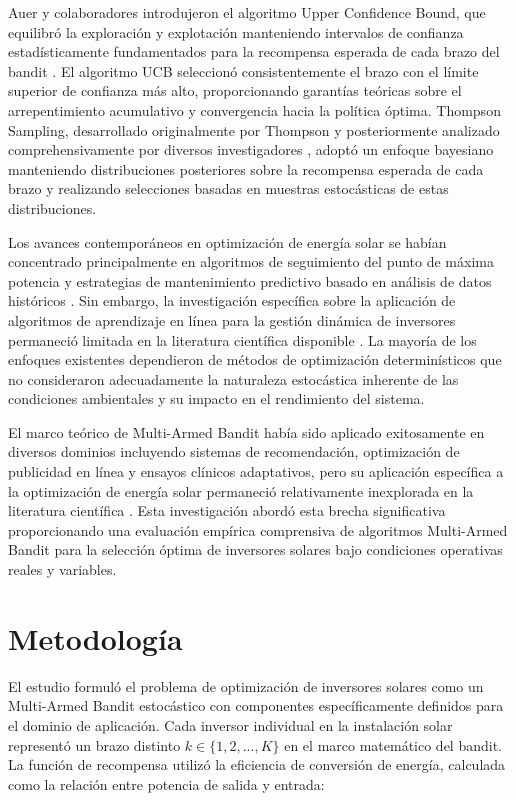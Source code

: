 \documentclass[12pt,a4paper]{article}
\begin{document}
Auer y colaboradores introdujeron el algoritmo Upper Confidence Bound, que equilibró la exploración y explotación manteniendo intervalos de confianza estadísticamente fundamentados para la recompensa esperada de cada brazo del bandit \cite{auer2002}. El algoritmo UCB seleccionó consistentemente el brazo con el límite superior de confianza más alto, proporcionando garantías teóricas sobre el arrepentimiento acumulativo y convergencia hacia la política óptima. Thompson Sampling, desarrollado originalmente por Thompson \cite{thompson1933} y posteriormente analizado comprehensivamente por diversos investigadores \cite{chapelle2011}, adoptó un enfoque bayesiano manteniendo distribuciones posteriores sobre la recompensa esperada de cada brazo y realizando selecciones basadas en muestras estocásticas de estas distribuciones.

Los avances contemporáneos en optimización de energía solar se habían concentrado principalmente en algoritmos de seguimiento del punto de máxima potencia y estrategias de mantenimiento predictivo basado en análisis de datos históricos \cite{motahhir2020}. Sin embargo, la investigación específica sobre la aplicación de algoritmos de aprendizaje en línea para la gestión dinámica de inversores permaneció limitada en la literatura científica disponible \cite{abdel2021}. La mayoría de los enfoques existentes dependieron de métodos de optimización determinísticos que no consideraron adecuadamente la naturaleza estocástica inherente de las condiciones ambientales y su impacto en el rendimiento del sistema.

El marco teórico de Multi-Armed Bandit había sido aplicado exitosamente en diversos dominios incluyendo sistemas de recomendación, optimización de publicidad en línea y ensayos clínicos adaptativos, pero su aplicación específica a la optimización de energía solar permaneció relativamente inexplorada en la literatura científica \cite{bouneffouf2019}. Esta investigación abordó esta brecha significativa proporcionando una evaluación empírica comprensiva de algoritmos Multi-Armed Bandit para la selección óptima de inversores solares bajo condiciones operativas reales y variables.

\section{Metodología}

\justify
El estudio formuló el problema de optimización de inversores solares como un Multi-Armed Bandit estocástico con componentes específicamente definidos para el dominio de aplicación. Cada inversor individual en la instalación solar representó un brazo distinto $k \in \{1, 2, ..., K\}$ en el marco matemático del bandit. La función de recompensa utilizó la eficiencia de conversión de energía, calculada como la relación entre potencia de salida y entrada:
\end{document}
